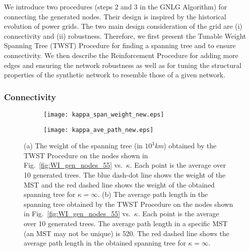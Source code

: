 \documentclass[10pt,journal]{IEEEtran}
\begin{document}
We introduce two procedures (steps 2 and 3 in the GNLG Algorithm)  for connecting the generated nodes. Their design is inspired by the historical evolution of power grids.
The two main design consideration of the grid are (i) connectivity and (ii) robustness. Therefore, we first present the Tunable Weight Spanning Tree (TWST) Procedure for finding a spanning tree and to ensure connectivity. We then describe the Reinforcement Procedure for adding more edges and ensuring the network robustness as well as for tuning the structural properties of the synthetic network to resemble those of a given network.

\subsubsection{Connectivity}


\begin{figure}[t]
\centering
\begin{subfigure}[b]{0.24\textwidth}
\vspace*{-0.2cm}
\texttt{[image: kappa\_span\_weight\_new.eps]}
\vspace*{-0.2cm}
\caption{}
\label{fig:kappa_span_weight}
\vspace*{0.2cm}
\end{subfigure}
\begin{subfigure}[b]{0.24\textwidth}
\vspace*{-0.2cm}
\texttt{[image: kappa\_ave\_path\_new.eps]}
\vspace*{-0.2cm}
\caption{}
\label{fig:kappa_ave_path}
\vspace*{0.2cm}
\end{subfigure}
\caption{(a) The weight of the spanning tree (in $10^3$\emph{km}) obtained by the TWST Procedure on the nodes shown in Fig.~\ref{fig:WI_gen_nodes_55} vs.\ $\kappa$. Each point is the average over 10 generated trees. The blue dash-dot line shows the weight of the MST and the red dashed line shows the weight of the obtained spanning tree for $\kappa=\infty$. (b) The average path length in the spanning tree obtained by the TWST Procedure on the nodes shown in Fig.~\ref{fig:WI_gen_nodes_55} vs.\ $\kappa$. Each point is the average over 10 generated trees. The average path length in a specific MST (an MST may not be unique) is 520. The red dashed line shows the average path length in the obtained spanning tree for $\kappa=\infty$.}
\label{fig:kappa}
\end{figure}
\end{document}
